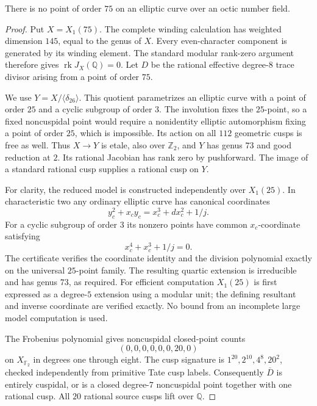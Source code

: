 \begin{proposition}\label{prop:octic-C75}
There is no point of order $75$ on an elliptic curve over an octic
number field.
\end{proposition}
\begin{proof}
Put $X=X_1(75)$. The complete winding calculation has weighted
dimension $145$, equal to the genus of $X$. Every even-character
component is generated by its winding element. The standard modular
rank-zero argument therefore gives $\operatorname{rk}J_X(\mathbb Q)=0$.
Let $D$ be the rational effective degree-$8$ trace divisor arising
from a point of order $75$.

We use $Y=X/\langle\delta_{26}\rangle$. This quotient parametrizes
an elliptic curve with a point of order $25$ and a cyclic subgroup
of order $3$. The involution fixes the $25$-point, so a fixed
noncuspidal point would require a nonidentity elliptic automorphism
fixing a point of order $25$, which is impossible. Its action on
all $112$ geometric cusps is free as well. Thus $X\to Y$ is etale,
also over $\mathbb Z_2$, and $Y$ has genus $73$ and good reduction
at $2$. Its rational Jacobian has rank zero by pushforward.
The image of a standard rational cusp supplies a rational cusp on $Y$.

For clarity, the reduced model is constructed independently over
$X_1(25)$. In characteristic two any ordinary elliptic curve has
canonical coordinates
\[
 y_c^2+x_cy_c=x_c^3+d x_c^2+1/j.
\]
For a cyclic subgroup of order $3$ its nonzero points have common
$x_c$-coordinate satisfying
\[
 x_c^4+x_c^3+1/j=0.                                   \tag{1}
\]
The certificate verifies the coordinate identity and the division
polynomial exactly on the universal $25$-point family. The resulting
quartic extension is irreducible and has genus $73$, as required.
For efficient computation $X_1(25)$ is first expressed as a degree-$5$
extension using a modular unit; the defining resultant and inverse
coordinate are verified exactly. No bound from an incomplete large
model computation is used.

The Frobenius polynomial gives noncuspidal closed-point counts
\[
 (0,0,0,0,0,0,20,0)
\]
on $X_{\mathbb F_2}$ in degrees one through eight. The cusp signature
is $1^{20},2^{10},4^8,20^2$, checked independently from primitive
Tate cusp labels. Consequently $\overline D$ is entirely cuspidal,
or is a closed degree-$7$ noncuspidal point together with one rational
cusp. All $20$ rational source cusps lift over $\mathbb Q$.


\end{proof}
